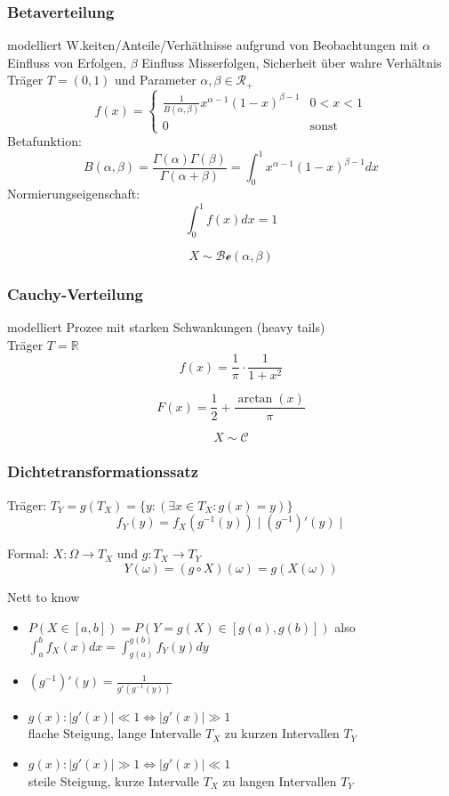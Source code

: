 \documentclass[10pt,a4paper,landscape]{article}
\begin{document}
\begin{multicols}{4}
\subsubsection{Betaverteilung}
modelliert W.keiten/Anteile/Verhätlnisse aufgrund von Beobachtungen mit $\alpha$ Einfluss von Erfolgen, $\beta$ Einfluss Misserfolgen, Sicherheit über wahre Verhältnis \\
Träger $T=(0,1)$ und Parameter $\alpha , \beta \in \mathcal{R}_+$
\[
f(x)= \begin{cases}
\frac{1}{B(\alpha , \beta)}x^{\alpha - 1}(1-x)^{\beta -1} &0<x<1 \\
0 &\text{sonst}
\end{cases}
\]
Betafunktion:
\[
B(\alpha , \beta)= \frac{\Gamma(\alpha) \Gamma(\beta)}{\Gamma(\alpha + \beta)}=\int_0^1x^{\alpha-1}(1-x)^{\beta -1}dx
\]
Normierungseigenschaft:
\[
\int_0^1f(x)dx = 1
\]

\[
X \sim \mathcal{Be}(\alpha , \beta)
\]

\subsubsection{Cauchy-Verteilung}
modelliert Prozee mit starken Schwankungen (heavy tails)\\
Träger $T=\mathbb{R}$
\[
f(x) = \frac{1}{\pi} \cdot \frac{1}{1+x^2}
\]

\[
F(x)=\frac{1}{2}+\frac{\arctan(x)}{\pi}
\]

\[
X \sim \mathcal{C}
\]

\subsubsection{Dichtetransformationssatz}
Träger: $T_Y= g(T_X)=\{ y:(\exists x \in T_X : g(x)=y) \}$
\[
f_Y(y) = f_X(g^{-1}(y))\mid (g^{-1})'(y)\mid
\]

Formal: $X: \Omega \rightarrow T_X$ und $g:T_X \rightarrow T_Y$
\[
Y(\omega ) = (g \circ X)(\omega ) = g(X(\omega ))
\]

Nett to know

\begin{itemize}
\item $P(X \in [a,b])=P(Y=g(X) \in [g(a),g(b)])$ also $\int_a^bf_X(x)dx=\int_{g(a)}^{g(b)}f_Y(y)dy$
\item $(g^{-1})'(y)=\frac{1}{g'(g^{-1}(y))}$
\item $g(x): \mid g'(x)\mid \ll 1 \Leftrightarrow \mid g'(x)\mid \gg 1$ \\
flache Steigung, lange Intervalle $T_X$ zu kurzen Intervallen $T_Y$
\item $g(x): \mid g'(x)\mid \gg 1 \Leftrightarrow \mid g'(x)\mid \ll 1$ \\
steile Steigung, kurze Intervalle $T_X$ zu langen Intervallen $T_Y$
\end{itemize}


\end{multicols}
\end{document}

